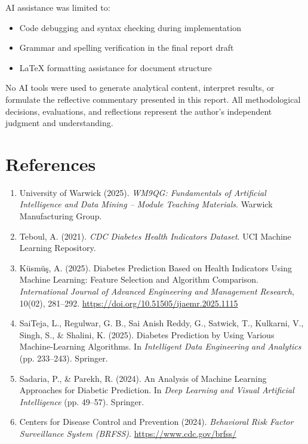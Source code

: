 \documentclass[12pt,a4paper]{article}
\begin{document}
AI assistance was limited to:
\begin{itemize}
    \item Code debugging and syntax checking during implementation
    \item Grammar and spelling verification in the final report draft
    \item LaTeX formatting assistance for document structure
\end{itemize}

No AI tools were used to generate analytical content, interpret results, or formulate the reflective commentary presented in this report. All methodological decisions, evaluations, and reflections represent the author's independent judgment and understanding.

\section{References}

\begin{enumerate}
    \item University of Warwick (2025). \textit{WM9QG: Fundamentals of Artificial Intelligence and Data Mining – Module Teaching Materials}. Warwick Manufacturing Group.
    
    \item Teboul, A. (2021). \textit{CDC Diabetes Health Indicators Dataset}. UCI Machine Learning Repository.
    
    \item Küsmüş, A. (2025). Diabetes Prediction Based on Health Indicators Using Machine Learning: Feature Selection and Algorithm Comparison. \textit{International Journal of Advanced Engineering and Management Research}, 10(02), 281--292. \url{https://doi.org/10.51505/ijaemr.2025.1115}
    
    \item SaiTeja, L., Regulwar, G. B., Sai Anish Reddy, G., Satwick, T., Kulkarni, V., Singh, S., \& Shalini, K. (2025). Diabetes Prediction by Using Various Machine-Learning Algorithms. In \textit{Intelligent Data Engineering and Analytics} (pp. 233--243). Springer.
    
    \item Sadaria, P., \& Parekh, R. (2024). An Analysis of Machine Learning Approaches for Diabetic Prediction. In \textit{Deep Learning and Visual Artificial Intelligence} (pp. 49--57). Springer.
    
    \item Centers for Disease Control and Prevention (2024). \textit{Behavioral Risk Factor Surveillance System (BRFSS)}. \url{https://www.cdc.gov/brfss/}
\end{enumerate}
\end{document}
